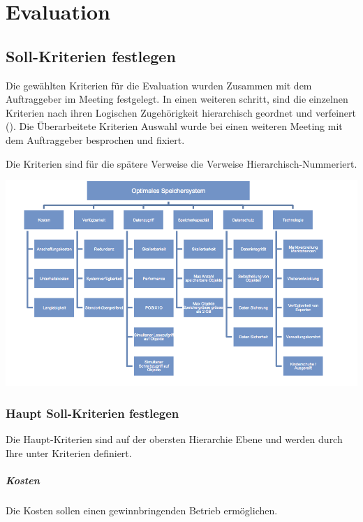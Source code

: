 \cleardoublepage
\chapter{Evaluation}

\section{Soll-Kriterien festlegen}
Die gewählten Kriterien für die Evaluation wurden Zusammen mit dem Auftraggeber im Meeting festgelegt. In einen weiteren schritt, sind die einzelnen Kriterien nach ihren Logischen Zugehörigkeit hierarchisch geordnet und verfeinert (). Die Überarbeitete Kriterien Auswahl wurde bei einen weiteren Meeting mit dem Auftraggeber besprochen und fixiert. 

Die Kriterien sind für die spätere Verweise die Verweise Hierarchisch-Nummeriert.

\begin{center}
\includegraphics[width=\linewidth, keepaspectratio = true]{media/ahp_kirterienbaum.png}
\end{center}

\subsection{Haupt Soll-Kriterien festlegen}
Die Haupt-Kriterien sind auf der obersten Hierarchie Ebene und werden durch Ihre unter Kriterien definiert.
\setcounter{paragraph}{0}
\renewcommand\theparagraph{Soll-\arabic{paragraph}}
\paragraph{Kosten}\label{Soll-1}
Die Kosten sollen einen gewinnbringenden Betrieb ermöglichen. 

